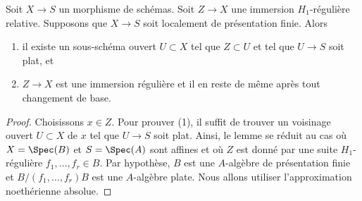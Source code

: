 \begin{lemma}
\label{lemma-flat-relative-H1-regular}
Soit  $X \to S$  un morphisme de schémas. Soit  $Z \to X$  une immersion
 $H_1$-régulière relative. Supposons que  $X \to S$  soit localement de
présentation finie. Alors
\begin{enumerate}
\item il existe un sous-schéma ouvert  $U \subset X$  tel que  $Z \subset U$  et tel que
 $U \to S$  soit plat, et
\item $Z \to X$  est une immersion régulière et il en reste de même après tout
changement de base.
\end{enumerate}
\end{lemma}

\begin{proof}
Choisissons  $x \in Z$. Pour prouver (1), il suffit de trouver un voisinage ouvert
 $U \subset X$  de  $x$  tel que  $U \to S$  soit plat. Ainsi, le lemme se
réduit au cas où  $X = \Spec(B)$  et  $S = \Spec(A)$  sont affines et où  $Z$  est
donné par une suite  $H_1$-régulière  $f_1, \ldots, f_r \in B$. Par hypothèse,
 $B$  est une  $A$-algèbre de présentation finie et  $B/(f_1, \ldots, f_r)B$ 
est une  $A$-algèbre plate. Nous allons utiliser l'approximation
noethérienne absolue.


\end{proof}
